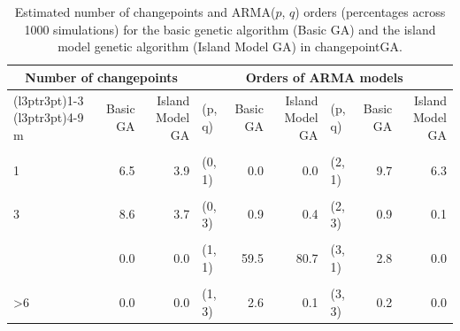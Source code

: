 \begin{table}[!h]
\centering
\caption{\label{tab:LocationestOrderTab}Estimated number of changepoints and ARMA($p$, $q$) orders (percentages across 1000 simulations) for the basic genetic algorithm (Basic GA) and the island model genetic algorithm (Island Model GA) in changepointGA.}
\centering
\fontsize{6}{8}\selectfont
\begin{tabular}[t]{lr>{}r|>{}lr>{}r|>{}lrr}
\toprule
\multicolumn{3}{c}{Number of changepoints} & \multicolumn{6}{c}{Orders of ARMA models} \\
\cmidrule(l{3pt}r{3pt}){1-3} \cmidrule(l{3pt}r{3pt}){4-9}
m & Basic GA & Island Model GA & (p, q) & Basic GA & Island Model GA & (p, q) & Basic GA & Island Model GA\\
\midrule
\cellcolor{gray!10}{0} & \cellcolor{gray!10}{0.6} & \cellcolor{gray!10}{0.7} & \cellcolor{gray!10}{(0, 0)} & \cellcolor{gray!10}{0.0} & \cellcolor{gray!10}{0.0} & \cellcolor{gray!10}{(2, 0)} & \cellcolor{gray!10}{0.0} & \cellcolor{gray!10}{0.0}\\
1 & 6.5 & 3.9 & (0, 1) & 0.0 & 0.0 & (2, 1) & 9.7 & 6.3\\
\cellcolor{gray!10}{2} & \cellcolor{gray!10}{83.5} & \cellcolor{gray!10}{91.7} & \cellcolor{gray!10}{(0, 2)} & \cellcolor{gray!10}{0.0} & \cellcolor{gray!10}{0.0} & \cellcolor{gray!10}{(2, 2)} & \cellcolor{gray!10}{13.8} & \cellcolor{gray!10}{4.5}\\
3 & 8.6 & 3.7 & (0, 3) & 0.9 & 0.4 & (2, 3) & 0.9 & 0.1\\
\cellcolor{gray!10}{4} & \cellcolor{gray!10}{0.8} & \cellcolor{gray!10}{0.0} & \cellcolor{gray!10}{(1, 0)} & \cellcolor{gray!10}{0.0} & \cellcolor{gray!10}{0.0} & \cellcolor{gray!10}{(3, 0)} & \cellcolor{gray!10}{0.0} & \cellcolor{gray!10}{0.0}\\
\addlinespace
5 & 0.0 & 0.0 & (1, 1) & 59.5 & 80.7 & (3, 1) & 2.8 & 0.0\\
\cellcolor{gray!10}{6} & \cellcolor{gray!10}{0.0} & \cellcolor{gray!10}{0.0} & \cellcolor{gray!10}{(1, 2)} & \cellcolor{gray!10}{9.2} & \cellcolor{gray!10}{7.8} & \cellcolor{gray!10}{(3, 2)} & \cellcolor{gray!10}{0.4} & \cellcolor{gray!10}{0.1}\\
>6 & 0.0 & 0.0 & (1, 3) & 2.6 & 0.1 & (3, 3) & 0.2 & 0.0\\
\bottomrule
\end{tabular}
\end{table}

